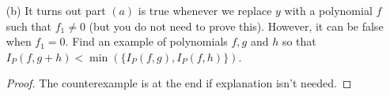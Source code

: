 \documentclass{article}
\begin{document}
\begin{itemize}
\begin{proof}
                We note that $I_{P}(g_{0} + g_{1} + \cdots, y) = 0$ because the $y$ vanishes on $(0, 0)$ but the $g_{0} + g_{1} + \cdots$ does not because $g_{0} \neq 0$. So the RHS turns out to be
                    \begin{equation*}
                        \min(i, k)
                    \end{equation*}
                While
                    \begin{equation*}
                        I_{P}(y, g + h) = I_{P}(y, g^{\prime} + h^{\prime})
                    \end{equation*}
                and we note that $g^{\prime} + h^{\prime}$ has multiplicity greater than or equal to $g^{\prime}$ and $h^{\prime}$. So in the same process above,
                    \begin{equation*}
                        g^{\prime} + h^{\prime} = (g^{\prime} + h^{\prime})_{0} + (g^{\prime} + h^{\prime})_{1} + \cdots
                    \end{equation*}
                and the first non zero homogeneous form is at least $\min(i, k)$. So repeating the process gives us $I_{P}(y, g + h) \geq \min(i, k)$, so we are done.
            \end{proof}

        \item [(b)] It turns out part $(a)$ is true whenever we replace $y$ with a polynomial $f$ such that $f_{1} \neq 0$ (but you do not need to prove this). However, it can be false when $f_{1} = 0$. Find an example of polynomials $f, g$ and $h$ so that $I_{P}(f, g + h) <  \min(\{I_{P}(f, g), I_{P}(f, h)\})$. 
            \begin{proof}
                The counterexample is at the end if explanation isn't needed.


\end{proof}
\end{itemize}
\end{document}
